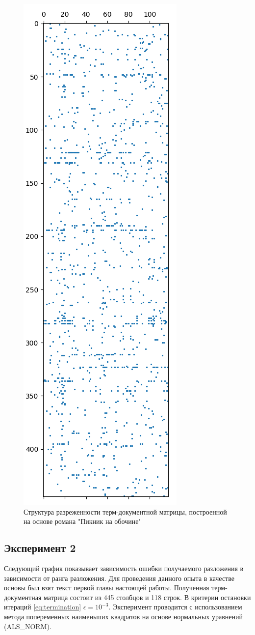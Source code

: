 \begin{figure}[h]
  \includegraphics[width=0.3\linewidth]{assets/SparsityPattern.png}
  \caption{Структура разреженности терм-документной матрицы, построенной на основе романа "Пикник на обочине"}
  \label{fig:SparsityPattern}
\end{figure}
\newpage


\subsection{Эксперимент 2}

Следующий график показывает зависимость ошибки получаемого разложения в зависимости от ранга разложения.
Для проведения данного опыта в качестве основы был взят текст первой главы настоящей работы.
Полученная терм-документная матрица состоит из 445 столбцов и 118 строк.
В критерии остановки итераций \eqref{eq:termination} $\epsilon = 10^{-3}$.
Эксперимент проводится с использованием метода попеременных наименьших квадратов на основе нормальных уравнений (ALS\_NORM).


